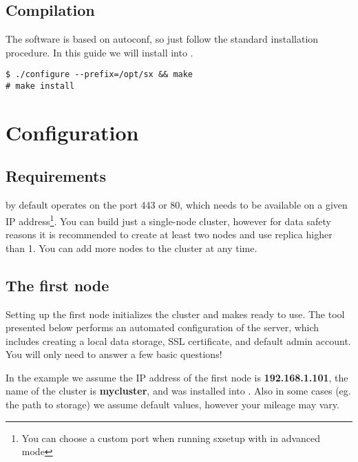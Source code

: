 \section*{Compilation}

The software is based on autoconf, so just follow the standard installation
procedure. In this guide we will install \SX into .
\small
\begin{lstlisting}
$ ./configure --prefix=/opt/sx && make
# make install
\end{lstlisting}
\LARGE


\chapter{Configuration}

\section*{Requirements}

\SX by default operates on the port 443 or 80, which needs to be available on
a given IP address\footnote{You can choose a custom port when running sxsetup with
in advanced mode}. You can build just a single-node \SX cluster, however for data
safety reasons it is recommended to create at least two nodes and use replica higher
than 1. You can add more nodes to the cluster at any time.

\section*{The first node}

Setting up the first node initializes the cluster and makes \SX ready to
use. The  tool presented below performs an automated
configuration of the \SX server, which includes creating a local
data storage, SSL certificate, and default admin account. You will only
need to answer a few basic questions!

In the example we assume the IP address of the first node is
\textbf{192.168.1.101}, the name of the cluster is \textbf{mycluster},
and \SX was installed into . Also in some cases (eg. the path to
\SX storage) we assume default values, however your mileage may vary.

